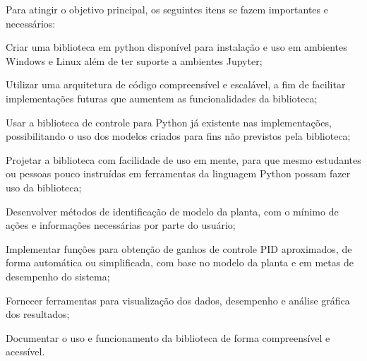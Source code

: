 Para atingir o objetivo principal, os seguintes itens se fazem importantes e necessários:
\begin{alineas}
    \item Criar uma biblioteca em python disponível para instalação e uso em ambientes Windows e Linux além de ter
    suporte a ambientes Jupyter;
    \item Utilizar uma arquitetura de código compreensível e escalável, a fim de facilitar implementações futuras
    que aumentem as funcionalidades da biblioteca;
    \item Usar a biblioteca de controle para Python já existente nas implementações, possibilitando o uso dos modelos
    criados para fins não previstos pela biblioteca;
    \item Projetar a biblioteca com facilidade de uso em mente, para que mesmo estudantes ou pessoas pouco instruídas
    em ferramentas da linguagem Python possam fazer uso da biblioteca;
    \item Desenvolver métodos de identificação de modelo da planta, com o mínimo de ações e informações necessárias por
    parte do usuário;
    \item Implementar funções para obtenção de ganhos de controle PID aproximados, de forma automática ou simplificada,
    com base no modelo da planta e em metas de desempenho do sistema;
    \item Fornecer ferramentas para visualização dos dados, desempenho e análise gráfica dos resultados;
    \item Documentar o uso e funcionamento da biblioteca de forma compreensível e acessível.
\end{alineas}
